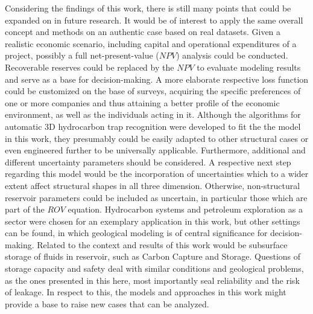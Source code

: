 	Considering the findings of this work, there is still many points that could be expanded on in future research. It would be of interest to apply the same overall concept and methods on an authentic case based on real datasets. Given a realistic economic scenario, including capital and operational expenditures of a project, possibly a full net-present-value ($NPV$) analysis could be conducted. Recoverable reserves could be replaced by the $NPV$ to evaluate modeling results and serve as a base for decision-making. A more elaborate respective loss function could be customized on the base of surveys, acquiring the specific preferences of one or more companies and thus attaining a better profile of the economic environment, as well as the individuals acting in it. Although the algorithms for automatic 3D hydrocarbon trap recognition were developed to fit the the model in this work, they presumably could be easily adapted to other structural cases or even engineered further to be universally applicable. 
	Furthermore, additional and different uncertainty parameters should be considered. A respective next step regarding this model would be the incorporation of uncertainties which to a wider extent affect structural shapes in all three dimension. Otherwise, non-structural reservoir parameters could be included as uncertain, in particular those which are part of the $ROV$ equation. 
	Hydrocarbon systems and petroleum exploration as a sector were chosen for an exemplary application in this work, but other settings can be found, in which geological modeling is of central significance for decision-making. Related to the context and results of this work would be subsurface storage of fluids in reservoir, such as Carbon Capture and Storage. Questions of storage capacity and safety deal with similar conditions and geological problems, as the ones presented in this here, most importantly seal reliability and the risk of leakage. In respect to this, the models and approaches in this work might provide a base to raise new cases that can be analyzed.